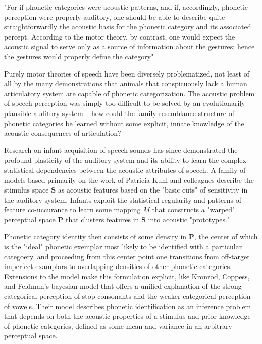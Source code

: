\begin{multicols}{2}
\begin{leftbar}
"For if phonetic categories were acoustic patterns, and if, accordingly, phonetic perception were properly auditory, one should be able to describe quite straightforwardly the acoustic basis for the phonetic category and its associated percept. According to the motor theory, by contrast, one would expect the acoustic signal to serve only as a source of information about the gestures; hence the gestures would properly define the category"
\cite{Liberman1985a}
\end{leftbar}

Purely motor theories of speech have been diversely problematized, not least of all by the many demonstrations that animals that conspicuously lack a human articulatory system are capable of phonetic categorization\cite{Carbonell2014,Lotto1997,Kluender2000}. The acoustic problem of speech perception was simply too difficult to be solved by an evolutionarily plausible auditory system -- how could the family resemblance structure of phonetic categories be learned without some explicit, innate knowledge of the acoustic consequences of articulation?\cite{Bailey1980} 

Research on infant acquisition of speech sounds has since demonstrated the profound plasticity of the auditory system and its ability to learn the complex statistical dependencies between the acoustic attributes of speech\cite{kuhlNewViewLanguage2000}. A family of models based primarily on the work of Patricia Kuhl and colleagues describe the stimulus space $\mathbf{S}$ as acoustic features based on the "basic cuts" of sensitivity in the auditory system\cite{kuhlEarlyLanguageAcquisition2004}. Infants exploit the statistical regularity and patterns of feature co-uccurance to learn some mapping $M$ that constructs a "warped" perceptual space $\mathbf{P}$ that clusters features in $\mathbf{S}$ into acoustic "prototypes."\cite{kuhlNewViewLanguage2000} 

Phonetic category identity then consists of some density in $\mathbf{P}$, the center of which is the "ideal" phonetic exemplar most likely to be identified with a particular categoery, and proceeding from this center point one transitions from off-target imperfect examplars to overlapping densities of other phonetic categories. Extensions to the model make this formulation explicit, like Kronrod, Coppess, and Feldman's\cite{Kronrod2016a} bayesian model that offers a unified explanation of the strong categorical perception of stop consonants and the weaker categorical perception of vowels. Their model describes phonetic identification as an inference problem that depends on both the acoustic properties of a stimulus and prior knowledge of phonetic categories, defined as some mean and variance in an arbitrary perceptual space. 


\end{multicols}
